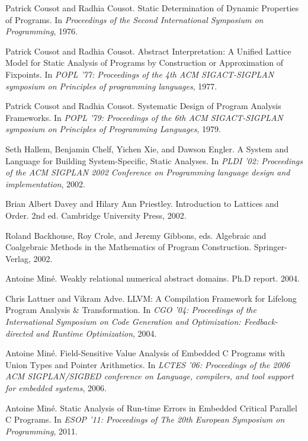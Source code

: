 \documentclass[a4paper]{book}
\begin{document}
\cleardoublepage
{}
\begin{thebibliography}{9}

 Patrick Cousot and Radhia Cousot.  Static Determination
  of Dynamic Properties of Programs.  In {\em Proceedings of the
    Second International Symposium on Programming}, 1976.

 Patrick Cousot and Radhia Cousot.  Abstract
  Interpretation: A Unified Lattice Model for Static Analysis of
  Programs by Construction or Approximation of Fixpoints.  In
  \emph{POPL '77: Proceedings of the 4th ACM SIGACT-SIGPLAN symposium
    on Principles of programming languages}, 1977.

 Patrick Cousot and Radhia Cousot.  Systematic Design of
  Program Analysis Frameworks.  In \emph{POPL '79: Proceedings of the
    6th ACM SIGACT-SIGPLAN symposium on Principles of Programming
    Languages}, 1979.

 Seth Hallem, Benjamin Chelf, Yichen Xie, and Dawson
  Engler.  A System and Language for Building System-Specific, Static
  Analyses.  In \emph{PLDI '02: Proceedings of the ACM SIGPLAN 2002
    Conference on Programming language design and implementation},
  2002.

 Brian Albert Davey and Hilary Ann
  Priestley. Introduction to Lattices and Order. 2nd ed. Cambridge
  University Press, 2002.

 Roland Backhouse, Roy Crole, and Jeremy Gibbons, eds.
  Algebraic and Coalgebraic Methods in the Mathematics of Program
  Construction.  Springer-Verlag, 2002.

 Antoine Miné.  Weakly relational numerical abstract
  domains. Ph.D report.  2004.

 Chris Lattner and Vikram Adve.  LLVM: A Compilation
  Framework for Lifelong Program Analysis \& Transformation. In
  \emph{CGO '04: Proceedings of the International Symposium on Code
    Generation and Optimization: Feedback-directed and Runtime
    Optimization}, 2004.

 Antoine Miné.  Field-Sensitive Value Analysis of
  Embedded C Programs with Union Types and Pointer Arithmetics.  In
  \emph{LCTES '06: Proceedings of the 2006 ACM SIGPLAN/SIGBED
    conference on Language, compilers, and tool support for embedded
    systems}, 2006.

 Antoine Miné.  Static Analysis of Run-time Errors in
  Embedded Critical Parallel C Programs.  In \emph{ESOP '11:
    Proceedings of The 20th European Symposium on Programming}, 2011.


\end{thebibliography}
\end{document}
